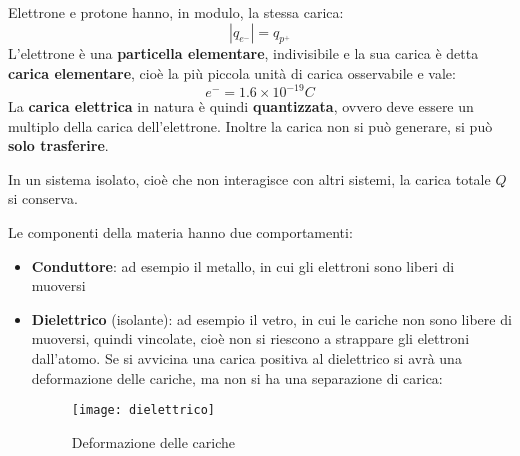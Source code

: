 \documentclass[a4paper]{article}
\begin{document}
Elettrone e protone hanno, in modulo, la stessa carica:
\[
  |q_{e^{-}}| = q_{p^{+}}
\] 
L'elettrone è una \textbf{particella elementare}, indivisibile e la sua carica è detta
\textbf{carica elementare}, cioè la più piccola unità di carica osservabile e vale:
\[
  e^- = 1.6 \times 10^{-19}C
\] 
La \textbf{carica elettrica} in natura è quindi \textbf{quantizzata}, ovvero deve
essere un multiplo della carica dell'elettrone. Inoltre la carica non si può generare,
si può \textbf{solo trasferire}.

\begin{definition}
  In un sistema isolato, cioè che non interagisce con altri sistemi, la carica totale 
  \( Q \) si conserva.
\end{definition}

\noindent
Le componenti della materia hanno due comportamenti:
\begin{itemize}
  \item \textbf{Conduttore}: ad esempio il metallo, in cui gli elettroni sono liberi di
    muoversi
  \item \textbf{Dielettrico} (isolante): ad esempio il vetro, in cui le cariche non sono
    libere di muoversi, quindi vincolate, cioè non si riescono a strappare gli elettroni
    dall'atomo. Se si avvicina una carica positiva al dielettrico si avrà una deformazione
    delle cariche, ma non si ha una separazione di carica:
    \begin{figure}[H]
      \centering
      \texttt{[image: dielettrico]}
      \caption{Deformazione delle cariche}
    \end{figure}
    
\end{itemize}
\end{document}
